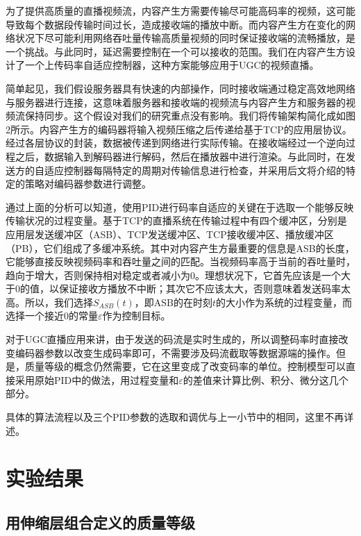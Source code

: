 为了提供高质量的直播视频流，内容产生方需要传输尽可能高码率的视频，这可能导致每个数据段传输时间过长，造成接收端的播放中断。而内容产生方在变化的网络状况下尽可能利用网络吞吐量传输高质量视频的同时保证接收端的流畅播放，是一个挑战。与此同时，延迟需要控制在一个可以接收的范围。我们在内容产生方设计了一个上传码率自适应控制器，这种方案能够应用于UGC的视频直播。

简单起见，我们假设服务器具有快速的内部操作，同时接收端通过稳定高效地网络与服务器进行连接，这意味着服务器和接收端的视频流与内容产生方和服务器的视频流保持同步。这个假设对我们的研究重点没有影响。我们将传输架构简化成如图2所示。内容产生方的编码器将输入视频压缩之后传递给基于TCP的应用层协议。经过各层协议的封装，数据被传递到网络进行实际传输。在接收端经过一个逆向过程之后，数据输入到解码器进行解码，然后在播放器中进行渲染。与此同时，在发送方的自适应控制器每隔特定的周期对传输信息进行检查，并采用后文将介绍的特定的策略对编码器参数进行调整。

通过上面的分析可以知道，使用PID进行码率自适应的关键在于选取一个能够反映传输状况的过程变量。基于TCP的直播系统在传输过程中有四个缓冲区，分别是应用层发送缓冲区（ASB）、TCP发送缓冲区、TCP接收缓冲区、播放缓冲区（PB），它们组成了多缓冲系统。其中对内容产生方最重要的信息是ASB的长度，它能够直接反映视频码率和吞吐量之间的匹配。当视频码率高于当前的吞吐量时，趋向于增大，否则保持相对稳定或者减小为0。理想状况下，它首先应该是一个大于0的值，以保证接收方播放不中断；其次它不应该太大，否则意味着发送码率太高。所以，我们选择$S_{ASB}(t)$，即ASB的在时刻$t$的大小作为系统的过程变量，而选择一个接近0的常量$\varepsilon$作为控制目标。

对于UGC直播应用来讲，由于发送的码流是实时生成的，所以调整码率时直接改变编码器参数以改变生成码率即可，不需要涉及码流截取等数据源端的操作。但是，质量等级的概念仍然需要，它在这里变成了改变码率的单位。控制模型可以直接采用原始PID中的做法，用过程变量和$\varepsilon$的差值来计算比例、积分、微分这几个部分。

具体的算法流程以及三个PID参数的选取和调优与上一小节中的相同，这里不再详述。

\section{实验结果}

\subsection{用伸缩层组合定义的质量等级}

